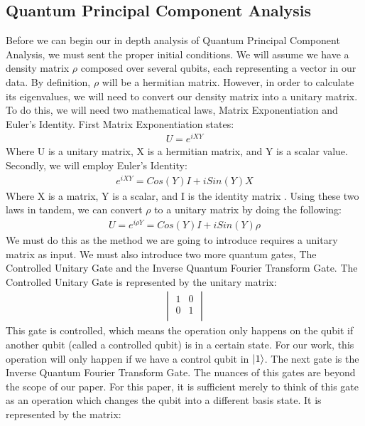 \documentclass[conference]{IEEEtran}
\begin{document}
\subsection{Quantum Principal Component Analysis}
Before we can begin our in depth analysis of Quantum Principal Component Analysis, we must sent the proper initial conditions. We will assume we have a density matrix $\rho$ composed over several qubits, each representing a vector in our data. By definition, $\rho$ will be a hermitian matrix. However, in order to calculate its eigenvalues, we will need to convert our density matrix into a unitary matrix. To do this, we will need two mathematical laws, Matrix Exponentiation and Euler's Identity. First Matrix Exponentiation states:    
\begin{align*}
U = e^{iXY}
\end{align*} 
Where U is a unitary matrix, X is a hermitian matrix, and Y is a scalar value. Secondly, we will employ Euler's Identity: 
\begin{align*}
e^{iXY} = Cos(Y)I + iSin(Y)X
\end{align*} 
Where X is a matrix, Y is a scalar, and I is the identity matrix \cite{b16}. Using these two laws in tandem, we can convert $\rho$ to a unitary matrix by doing the following:
\begin{align*}
 U = e^{i\rho Y} = Cos(Y)I + iSin(Y)\rho
\end{align*} \cite{b16}
We must do this as the method we are going to introduce requires a unitary matrix as input. We must also introduce two more quantum gates, The Controlled Unitary Gate and the Inverse Quantum Fourier Transform Gate. The Controlled Unitary Gate is represented by the unitary matrix: 
 \begin{align*}
    \begin{vmatrix}
    1 & 0 \\
    0 & 1  \\
    \end{vmatrix}
 \end{align*}  
This gate is controlled, which means the operation only happens on the qubit if another qubit (called a controlled qubit) is in a certain state. For our work, this operation will only happen if we have a control qubit in $\ket{1}$.  
\newline
\indent The next gate is the Inverse Quantum Fourier Transform Gate. The nuances of this gates are beyond the scope of our paper. For this paper, it is sufficient merely to think of this gate as an operation which changes the qubit into a different basis state. It is represented by the matrix: 
\end{document}
